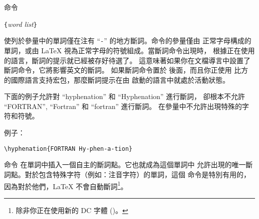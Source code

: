 命令
\begin{lscommand}
\verb|{|\emph{word list}\verb|}|
\end{lscommand}
使列於參量中的單詞僅在注有 ``\verb|-|'' 的地方斷詞。命令的參量僅由
正常字母構成的單詞，或由 \LaTeX{} 視為正常字母的符號組成。當斷詞命令出現時，
根據正在使用的語言，斷詞的提示就已經被存好待選了。
這意味著如果你在文檔導言中設置了斷詞命令，它將影響英文的斷詞。
如果斷詞命令置於 \verb|| 後面，而且你正使用
比方  的國際語言支持宏包，那麼斷詞提示在由  
啟動的語言中就處於活動狀態。

下面的例子允許對 ``hyphenation'' 和 ``Hyphenation'' 進行斷詞，
卻根本不允許 ``FORTRAN'', ``Fortran'' 和 ``fortran'' 進行斷詞。
在參量中不允許出現特殊的字符和符號。

例子：
\begin{code}
\verb|\hyphenation{FORTRAN Hy-phen-a-tion}|
\end{code}

命令 \ci{-} 在單詞中插入一個自主的斷詞點。它也就成為這個單詞中
允許出現的唯一斷詞點。對於包含特殊字符（例如：注音字符）的單詞，這個
命令是特別有用的，因為對於他們，\LaTeX{} 不會自動斷詞\footnote{除非你正在使用新的 DC 字體 ()。}。


